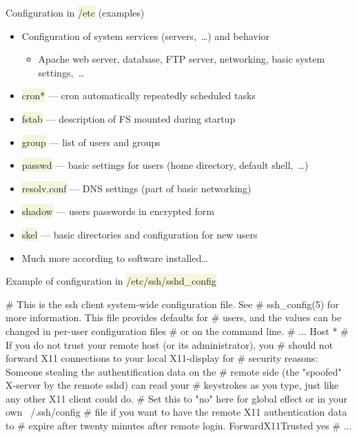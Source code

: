 \documentclass[compress, xelatex, 11pt, xcolor=svgnames, aspectratio=169,
	hyperref={
		bookmarks=true,
		unicode=true,
		colorlinks=true,
		pdftitle={Linux, command line and MetaCentrum},
		plainpages=false,
		pdfauthor={Vojtech Zeisek},
		pdfsubject={Course about use of Linux command line, writing shell scripts and using MetaCentrum of CESNET},
		pdfcreator={XeLaTeX},
		pdfkeywords={Linux, GNU, BASH, shell, command line, MetaCentrum},
		linkcolor=DarkRed, %
		anchorcolor=DarkBlue, %
		citecolor=Indigo, %
		filecolor=NavyBlue, %
		menucolor=DarkMagenta, %
		urlcolor=DarkBlue, %
		},
	url={hyphens, lowtilde} %
	]{beamer}
\renewcommand{\texttt}[1]{\colorbox{Beige}{{\ttfamily #1}}}
\begin{document}
\begin{frame}{Configuration in \texttt{/etc} (examples)}
	\begin{itemize}
		\item Configuration of system services (servers,~\ldots) and behavior
		\begin{itemize}
			\item Apache web server, database, FTP server, networking, basic system settings,~\ldots
		\end{itemize}
		\item \texttt{cron*} --- cron automatically repeatedly scheduled tasks
		\item \texttt{fstab} --- description of FS mounted during startup
		\item \texttt{group} --- list of users and groups
		\item \texttt{passwd} --- basic settings for users (home directory, default shell,~\ldots)
		\item \texttt{resolv.conf} ---  DNS settings (part of basic networking)
		\item \texttt{shadow} --- users passwords in encrypted form
		\item \texttt{skel} --- basic directories and configuration for new users
		\item Much more according to software installed\ldots
	\end{itemize}
\end{frame}

\begin{frame}[fragile]{Example of configuration in \texttt{/etc/ssh/sshd\_config}}
	\begin{bashcode}
    # This is the ssh client system-wide configuration file.  See
    # ssh_config(5) for more information.  This file provides defaults for
    # users, and the values can be changed in per-user configuration files
    # or on the command line.
    # ...
    Host *
    # If you do not trust your remote host (or its administrator), you
    # should not forward X11 connections to your local X11-display for
    # security reasons: Someone stealing the authentification data on the
    # remote side (the "spoofed" X-server by the remote sshd) can read your
    # keystrokes as you type, just like any other X11 client could do.
    # Set this to "no" here for global effect or in your own ~/.ssh/config
    # file if you want to have the remote X11 authentication data to
    # expire after twenty minutes after remote login.
    ForwardX11Trusted yes
    # ...
	\end{bashcode}
\end{frame}
\end{document}
